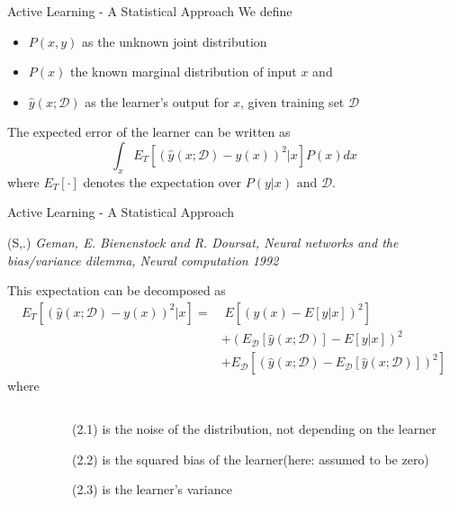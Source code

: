 \documentclass[10pt]{beamer}
\newenvironment{reference}[2]{%
  \begin{textblock*}{\textwidth}(#1,#2)
      \footnotesize\it\bgroup\color{red!50!black}}{\egroup\end{textblock*}}
\newcommand{\D}{\mathcal{D}}
\newcommand{\ly}{\hat{y}(x;\D)}
\begin{document}
\begin{frame}{Active Learning - A Statistical Approach}
We define
\begin{itemize}
\item $P(x,y)$ as the unknown joint distribution
\item $P(x)$ the known marginal distribution of input $x$ and
\item $\ly$ as the learner's output for $x$, given training set $\D$
\end{itemize}
The expected error of the learner can be written as
\begin{equation}
    \int_x E_T \left[\left(\ly - y(x)\right)^2|x\right] P(x)dx
\end{equation}
where $E_T\left[ \cdot \right]$ denotes the expectation over $P(y|x)$ and $\D$.
\end{frame}

\begin{frame}{Active Learning - A Statistical Approach}
\begin{reference}{4mm}{85mm}
  S. Geman, E. Bienenstock and R. Doursat,
  Neural networks and the bias/variance dilemma, Neural computation 1992
\end{reference}

This expectation can be decomposed as
\small \begin{align}
    E_T \left[\left(\ly - y(x)\right)^2|x\right] =
    & \; E\left[\left(y(x) - E\left[y|x\right]\right)^2\right] \tag{2.1}\\
    & + \left( E_{\D} \left[\ly\right] - E\left[y|x\right]\right)^2 \tag{2.2}\\
    & + E_{\D} \left[\left(\ly - E_{\D} \left[\ly\right]\right)^2 \right] \tag{2.3}
\end{align}\normalsize
where
\begin{columns}[t]
\begin{column}{0.02\textwidth} \end{column} %
\begin{column}{0.98\textwidth}\begin{itemize}
  \item[{\small(2.1)}] is the noise of the distribution, not depending on the learner
  \item[{\small(2.2)}] is the squared bias of the learner(here: assumed to be zero)
  \item[{\small(2.3)}] is the learner's variance
\end{itemize}\end{column}
\end{columns}
\end{frame}
\end{document}
